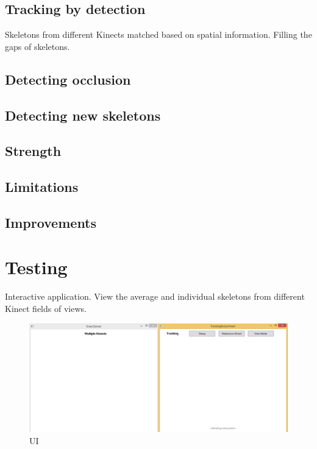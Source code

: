 \documentclass{sigchi}
\begin{document}
\subsection{Tracking by detection}

Skeletons from different Kinects matched based on spatial information. Filling the gaps of skeletons.

\subsection{Detecting occlusion}

\subsection{Detecting new skeletons}

\subsection{Strength}

\subsection{Limitations}

\subsection{Improvements}

\section{Testing}

Interactive application. View the average and individual skeletons from different Kinect fields of views.

\begin{figure}
  \centering
  \includegraphics[width=0.9\columnwidth]{ui}
  \caption{UI}
  \label{fig:ui}
\end{figure}
\end{document}
